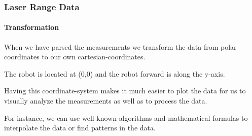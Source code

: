 \documentclass{beamer}
\begin{document}
\begin{frame}
\frametitle{Laser Range Data}
\framesubtitle{Transformation}

When we have parsed the measurements we transform the data from polar coordinates to our own cartesian-coordinates.

\pause
\vspace{10pt}

The robot is located at (0,0) and the robot forward is along the y-axis.

\pause
\vspace{10pt}

Having this coordinate-system makes it much easier to plot the data for us to visually analyze the measurements as well as to process the data.

\pause
\vspace{10pt}

For instance, we can use well-known algorithms and mathematical formulas to interpolate the data or find patterns in the data.


\end{frame}
\end{document}
